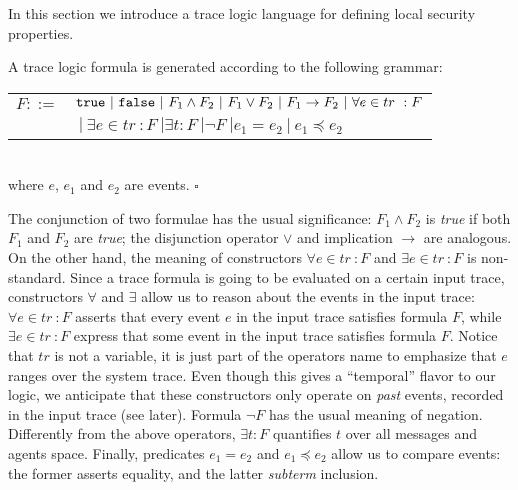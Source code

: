 \documentclass{entcs} \usepackage{entcsmacro}
\newcommand{\HB}{\hfill{$\square$}}
\begin{document}
In this section we introduce a trace logic language for defining  
local security properties.

\begin{definition} A trace logic formula is generated according to the following grammar:\\

\begin{tabular}{c l}

$F ::=$ & $\begin{tt}{true}\end{tt} \ | \ \begin{tt}{false}\end{tt} \ | \ F_1 \wedge F_2 \ | \ F_1 \vee F_2 \ | \ F_1 \rightarrow F_2 \ | \ \forall e \in tr \ : F $\\ 
&$\ | \ \exists e \in tr\ : F \ | \exists t : F \ | \neg F \ | e_1 = e_2 \ | \ e_1 \preceq e_2 $\\
\end{tabular}\\

where $e$, $e_1$ and $e_2$ are events. \HB
\end{definition} 

The conjunction of two formulae has the usual significance: $F_1
\wedge F_2$ is \emph{true} if both $F_1$ and $F_2$ are \emph{true};
the disjunction operator $\vee$ and implication $\rightarrow$ are
analogous.  On the other hand, the meaning of constructors $\forall e
\in tr\ : F$ and $\exists e \in tr\ : F$ is non-standard.  Since a
trace formula is going to be evaluated on a certain input trace,
constructors $\forall$ and $\exists$ allow us to reason about the
events in the input trace: $\forall e \in tr\ : F$ asserts that every
event $e$ in the input trace satisfies formula $F$, while $\exists e
\in tr\ : F$ express that some event in the input trace satisfies
formula $F$.  Notice that $tr$ is not a variable, it is just part of
the operators name to emphasize that $e$ ranges over the system trace.
Even though this gives a ``temporal'' flavor to our logic, we
anticipate that these constructors only operate on \emph{past} events,
recorded in the input trace (see later). Formula $\neg F$ has the
usual meaning of negation. Differently from the above operators,
$\exists t: F$ quantifies $t$ over all messages and agents space.
Finally, predicates $e_1 = e_2$ and $e_1 \preceq e_2$ allow us to
compare events: the former asserts equality, and the latter
\emph{subterm} inclusion.
\end{document}
